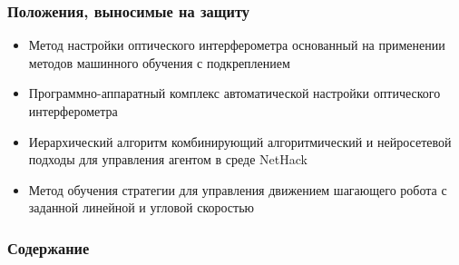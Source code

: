 \begin{frame}
    \setcounter{framenumber}{1}
    \maketitle
\end{frame}

\begin{frame}
    \frametitle{Положения, выносимые на защиту}
    \begin{itemize}
        \item Метод настройки оптического интерферометра основанный на применении методов машинного обучения с подкреплением
        \item Программно-аппаратный комплекс автоматической настройки оптического интерферометра
        \item Иерархический алгоритм комбинирующий алгоритмический и нейросетевой подходы для управления агентом в среде NetHack
        \item Метод обучения стратегии для управления движением шагающего робота с заданной линейной и угловой скоростью
    \end{itemize}
\end{frame}
\begin{frame}
    \frametitle{Содержание}
    \tableofcontents
\end{frame}
